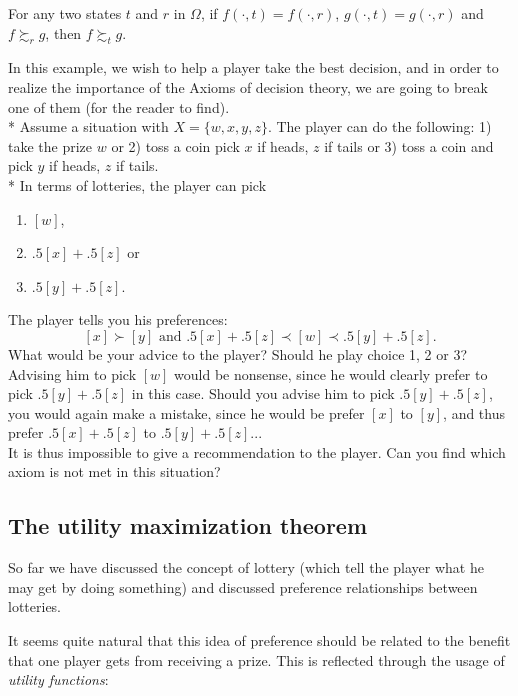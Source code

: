 \begin{axiom}
For any two states $t$ and $r$ in $\Omega$, if $f(\cdot, t) = f(\cdot, r) $, $g(\cdot, t) = g(\cdot, r) $ and $f \succsim_r g$, then $f \succsim_t g$.
\end{axiom}

\begin{example}
\label{ch1:nosubs}
In this example, we wish to help a player take the best decision, and in order to realize the importance of the Axioms of decision theory, we are going to break one of them (for the reader to find).  \\* 
Assume a situation with $X = \{w,x,y,z\}$. 
The player can do the following: 1) take the prize $w$ or 2) toss a coin  pick $x$ if heads, $z$ if tails or 3) toss a coin and pick  $y$ if heads, $z$ if tails.\\*
In terms of lotteries, the player can pick
\begin{enumerate}
\item $[w]$, 
\item $.5[x]+.5[z]$ or
\item $.5[y]+.5[z]$.
\end{enumerate}
The player tells you his preferences:
$$[x] \succ [y] \text{ and } .5[x]+.5[z] \prec [w] \prec.5[y]+.5[z].$$
What would be your advice to the player? Should he play choice 1, 2 or 3?\\
Advising him to pick $[w]$ would be nonsense, since he would clearly prefer to pick $.5[y]+.5[z]$ in this case. Should you advise him to pick $.5[y]+.5[z]$, you would again make a mistake, since he would be prefer $[x]$ to $[y]$, and thus prefer $.5[x]+.5[z]$ to $.5[y]+.5[z]$...\\
It is thus impossible to give a recommendation to the player. Can you find which axiom is not met in this situation?
\end{example}

\subsection{The utility maximization theorem}

So far we have discussed the concept of lottery (which tell the player what he may get by doing something) and discussed preference relationships between lotteries.

It seems quite natural that this idea of preference should be related to the benefit that one player gets from receiving a prize. This is reflected through the usage of \emph{utility functions}:

